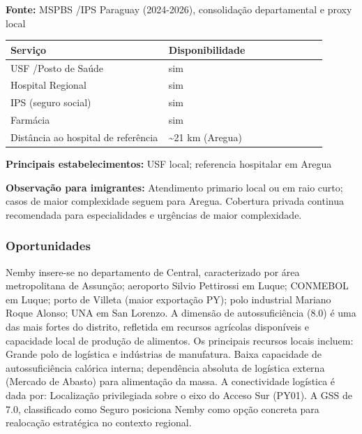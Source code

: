 \textbf{Fonte:} MSPBS /\allowbreak  IPS Paraguay (2024-2026), consolidação
departamental e proxy local

{\def\LTcaptype{none} %
\begin{longtable}{@{}>{\raggedright\arraybackslash}p{0.45\linewidth} >{\raggedright\arraybackslash}p{0.45\linewidth}@{}}
\toprule\noalign{}
Serviço & Disponibilidade \\
\midrule\noalign{}
\endhead
\bottomrule\noalign{}
\endlastfoot
USF /\allowbreak  Posto de Saúde & sim \\
Hospital Regional & sim \\
IPS (seguro social) & sim \\
Farmácia & sim \\
Distância ao hospital de referência & \textasciitilde21 km (Aregua) \\
\end{longtable}
}

\textbf{Principais estabelecimentos:} USF local; referencia hospitalar
em Aregua

\textbf{Observação para imigrantes:} Atendimento primario local ou em
raio curto; casos de maior complexidade seguem para Aregua. Cobertura
privada continua recomendada para especialidades e urgências de maior
complexidade.
\newpage

\subsubsection*{Oportunidades}\label{oport-nemby-1112}
Nemby insere-se no departamento de Central, caracterizado por área metropolitana de Assunção; aeroporto Silvio Pettirossi em Luque; CONMEBOL em Luque; porto de Villeta (maior exportação PY); polo industrial Mariano Roque Alonso; UNA em San Lorenzo. A dimensão de autossuficiência (8.0) é uma das mais fortes do distrito, refletida em recursos agrícolas disponíveis e capacidade local de produção de alimentos. Os principais recursos locais incluem: Grande polo de logística e indústrias de manufatura. Baixa capacidade de autossuficiência calórica interna; dependência absoluta de logística externa (Mercado de Abasto) para alimentação da massa. A conectividade logística é dada por: Localização privilegiada sobre o eixo do Acceso Sur (PY01). A GSS de 7.0, classificado como Seguro posiciona Nemby como opção concreta para realocação estratégica no contexto regional.

